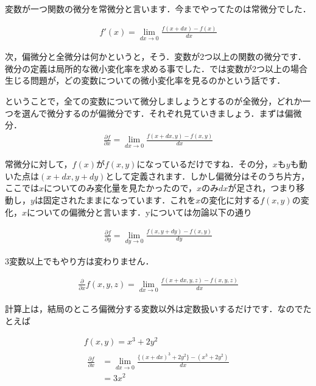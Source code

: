 \documentclass[11pt,a4paper]{jreport}
\begin{document}
変数が一つ関数の微分を常微分と言います．今までやってたのは常微分でした．

\begin{eqnarray}
f'(x) =\lim_{dx \rightarrow 0} \frac{f(x+dx) - f(x)}{dx}
\end{eqnarray}

次，偏微分と全微分は何かというと，そう．変数が2つ以上の関数の微分です．微分の定義は局所的な微小変化率を求める事でした．では変数が2つ以上の場合生じる問題が，どの変数についての微小変化率を見るのかという話です．

ということで，全ての変数について微分しましょうとするのが全微分，どれか一つを選んで微分するのが偏微分です．それぞれ見ていきましょう．まずは偏微分．\\

\begin{eqnarray}
\label{eq:partial}
\frac{\partial f}{\partial x} = \lim_{dx \rightarrow 0} \frac{f(x+dx, y) - f(x, y)}{dx}
\end{eqnarray}

常微分に対して，$f(x)$が$f(x,y)$になっているだけですね．その分，$x$も$y$も動いた点は$(x+dx, y+dy)$として定義されます．しかし偏微分はそのうち片方，ここでは$x$についてのみ変化量を見たかったので，$x$のみ$dx$が足され，つまり移動し，$y$は固定されたままになっています．これを$x$の変化に対する$f(x,y)$の変化，$x$についての偏微分と言います．yについては勿論以下の通り

\begin{eqnarray}
\frac{\partial f}{\partial y} = \lim_{dy \rightarrow 0} \frac{f(x, y+dy) - f(x, y)}{dy}
\end{eqnarray}

3変数以上でもやり方は変わりません．

\begin{eqnarray}
\frac{\partial}{\partial x}f(x,y,z) = \lim_{dx \rightarrow 0} \frac{f(x+dx, y,z) - f(x, y,z)}{dx}
\end{eqnarray}

計算上は，結局のところ偏微分する変数以外は定数扱いするだけです．なのでたとえば

\begin{eqnarray}
f(x,y) = x^3 + 2y^2\\
\begin{split}
\frac{\partial f}{\partial x} &= \lim_{dx \rightarrow 0} \frac{\{(x+dx)^3 + 2y^2\} - (x^3 + 2y^2)}{dx}\\
&= 3x^2
\end{split}
\end{eqnarray}
\end{document}
